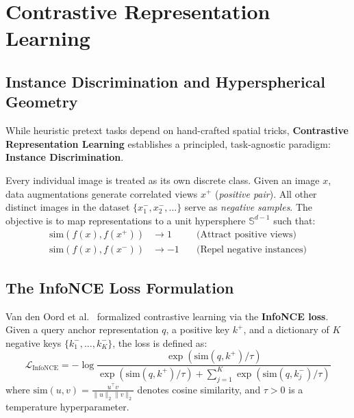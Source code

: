 \section{Contrastive Representation Learning}

\subsection{Instance Discrimination and Hyperspherical Geometry}

While heuristic pretext tasks depend on hand-crafted spatial tricks, \textbf{Contrastive Representation Learning} establishes a principled, task-agnostic paradigm: \textbf{Instance Discrimination}. 

Every individual image is treated as its own discrete class. Given an image $x$, data augmentations generate correlated views $x^+$ (\emph{positive pair}). All other distinct images in the dataset $\{x_1^-, x_2^-, \dots\}$ serve as \emph{negative samples}. The objective is to map representations to a unit hypersphere $\mathbb{S}^{d-1}$ such that:
\begin{align}
    \text{sim}(f(x), f(x^+)) &\to 1 \quad &\text{(Attract positive views)} \\
    \text{sim}(f(x), f(x^-)) &\to -1 \quad &\text{(Repel negative instances)}
\end{align}

\subsection{The InfoNCE Loss Formulation}

Van den Oord et al.~\cite{oord2018representation} formalized contrastive learning via the \textbf{InfoNCE loss}. Given a query anchor representation $q$, a positive key $k^+$, and a dictionary of $K$ negative keys $\{k_1^-, \dots, k_K^-\}$, the loss is defined as:
\begin{equation}
    \mathcal{L}_{\text{InfoNCE}} = - \log \frac{\exp(\text{sim}(q, k^+) / \tau)}{\exp(\text{sim}(q, k^+) / \tau) + \sum_{j=1}^K \exp(\text{sim}(q, k_j^-) / \tau)}
\end{equation}
where $\text{sim}(u, v) = \frac{u^\top v}{\|u\|_2 \|v\|_2}$ denotes cosine similarity, and $\tau > 0$ is a temperature hyperparameter.

